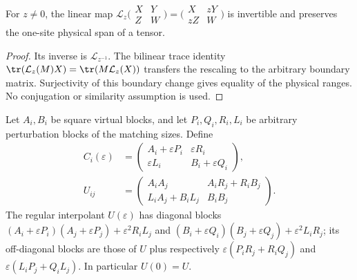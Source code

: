 \begin{lemma}
    \label{lem:uncle_virtual_rescaling}
    \leanok
    For $z\ne0$, the linear map
    $\mathcal L_z\bigl(\begin{smallmatrix}X&Y\\Z&W\end{smallmatrix}\bigr)
        =\bigl(\begin{smallmatrix}X&zY\\zZ&W\end{smallmatrix}\bigr)$
    is invertible and preserves the one-site physical span of a tensor.
\end{lemma}
\begin{proof}
    \leanok
    Its inverse is $\mathcal L_{z^{-1}}$. The bilinear trace identity
    $\tr(\mathcal L_z(M)X)=\tr(M\mathcal L_z(X))$ transfers the rescaling to
    the arbitrary boundary matrix. Surjectivity of this boundary change
    gives equality of the physical ranges. No conjugation or similarity
    assumption is used.
\end{proof}

\begin{definition}
    \label{def:two_block_uncle_tensor}
    \leanok
    Let $A_i,B_i$ be square virtual blocks, and let $P_i,Q_i,R_i,L_i$ be
    arbitrary perturbation blocks of the matching sizes. Define
    \begin{align}
        C_i(\varepsilon) & =
        \begin{pmatrix}A_i+\varepsilon P_i & \varepsilon R_i     \\
               \varepsilon L_i     & B_i+\varepsilon Q_i\end{pmatrix},
        \label{eq:uncle_perturbation} \\
        U_{ij}           & =
        \begin{pmatrix}A_iA_j        & A_iR_j+R_iB_j \\
               L_iA_j+B_iL_j & B_iB_j\end{pmatrix}.
        \label{eq:uncle_explicit_tensor}
    \end{align}
    The regular interpolant $U(\varepsilon)$ has diagonal blocks
    $(A_i+\varepsilon P_i)(A_j+\varepsilon P_j)+\varepsilon^2R_iL_j$
    and $(B_i+\varepsilon Q_i)(B_j+\varepsilon Q_j)+\varepsilon^2L_iR_j$;
    its off-diagonal blocks are those of $U$ plus respectively
    $\varepsilon(P_iR_j+R_iQ_j)$ and
    $\varepsilon(L_iP_j+Q_iL_j)$. In particular $U(0)=U$.
\end{definition}

